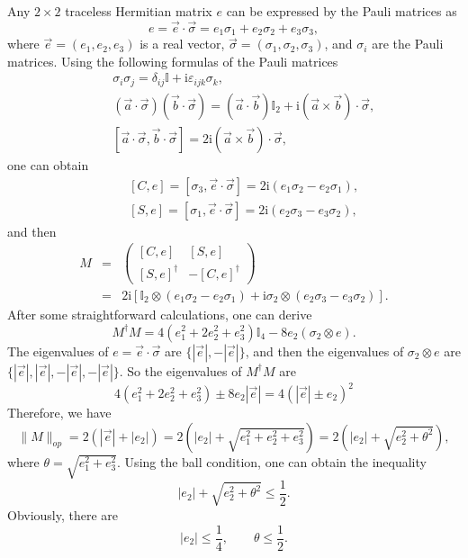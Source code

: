 \documentclass[a4paper,11pt]{article}
\begin{document}
Any $2 \times 2$ traceless Hermitian matrix $e$ can be expressed by the Pauli
matrices as
\begin{equation}
  e = \vec{e} \cdot \vec{\sigma} = e_1 \sigma_1 + e_2 \sigma_2 + e_3 \sigma_3,
\end{equation}
where $\vec{e} = (e_1, e_2, e_3)$ is a real vector, $\vec{\sigma} = (\sigma_1,
\sigma_2, \sigma_3)$, and $\sigma_i$ are the Pauli matrices. Using the
following formulas of the Pauli matrices
\begin{eqnarray}
  &&\sigma_i \sigma_j = \delta_{ij} \mathbb{I}+ \mathrm{i} \varepsilon_{ijk}
  \sigma_k,
\nonumber\\
  &&(\vec{a} \cdot \vec{\sigma})  (\vec{b} \cdot \vec{\sigma}) = (\vec{a} \cdot
  \vec{b}) \mathbb{I}_2 + \mathrm{i} (\vec{a} \times \vec{b}) \cdot
  \vec{\sigma},
\nonumber\\
  &&[\vec{a} \cdot \vec{\sigma}, \vec{b} \cdot \vec{\sigma}] = 2 \mathrm{i}
  (\vec{a} \times \vec{b}) \cdot \vec{\sigma},
\end{eqnarray}
one can obtain
\begin{eqnarray}
  &&[C, e] = [\sigma_3, \vec{e} \cdot \vec{\sigma}] = 2 \mathrm{i} (e_1 \sigma_2 -
  e_2 \sigma_1),
\nonumber\\
  &&[S, e] = [\sigma_1, \vec{e} \cdot \vec{\sigma}] = 2 \mathrm{i} (e_2 \sigma_3 -
  e_3 \sigma_2),
\end{eqnarray}
and then
\begin{eqnarray}
  M & = & \left( \begin{array}{cc}
    {}[C, e] & [S, e]\\
    {}[S, e]^{\dag} & - [C, e]^{\dag}
  \end{array} \right) \nonumber\\
  & = & 2 \mathrm{i} [\mathbb{I}_2 \otimes (e_1 \sigma_2 - e_2 \sigma_1) + \mathrm{i}
  \sigma_2 \otimes (e_2 \sigma_3 - e_3 \sigma_2)] . 
\end{eqnarray}
After some straightforward calculations, one can derive
\begin{equation}
  M^{\dagger} M = 4 (e_1^2 + 2 e_2^2 + e_3^2) \mathbb{I}_4 - 8 e_2  (\sigma_2
  \otimes e) .
\end{equation}
The eigenvalues of $e = \vec{e} \cdot \vec{\sigma}$ are $\{| \vec{e} |, - |
\vec{e} |\}$, and then the eigenvalues of $\sigma_2 \otimes e$ are $\{|
\vec{e} |, | \vec{e} |, - | \vec{e} |, - | \vec{e} |\}$. So the eigenvalues of
$M^{\dagger} M$ are
\[ 4 (e_1^2 + 2 e_2^2 + e_3^2) \pm 8 e_2 | \vec{e} | = 4 (| \vec{e} | \pm
   e_2)^2 \]
Therefore, we have
\begin{equation}
  \|M\|_{op} = 2 (| \vec{e} | + | e_2 |) = 2 (|e_2 | + \sqrt{e_1^2 + e_2^2 +
  e_3^2}) = 2 (|e_2 | + \sqrt{e_2^2 + \theta^2}),
\end{equation}
where $\theta = \sqrt{e_1^2 + e_3^2}$. Using the ball condition, one can
obtain the inequality
\begin{equation}
  |e_2 | + \sqrt{e_2^2 + \theta^2} \leqslant \frac{1}{2} .
\end{equation}
Obviously, there are
\begin{equation}
  |e_2 | \leqslant \frac{1}{4}, \qquad \theta \leqslant \frac{1}{2} .
\end{equation}
\end{document}
